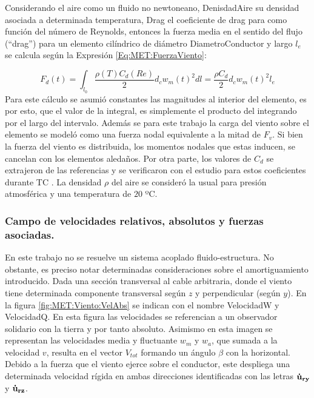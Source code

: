 Considerando el aire como un fluido no newtoneano, \gls{DenisdadAire} su densidad asociada a determinada temperatura, \gls{Drag} el coeficiente de drag para como función del número de Reynolds, entonces la fuerza media en el sentido del flujo (``drag'') para un elemento cilíndrico de diámetro \gls{DiametroConductor} y largo $l_e$ se calcula según la Expresión \eqref{Eq:MET:FuerzaViento}:


\begin{equation}
	\label{Eq:MET:FuerzaViento}
	F_d(t)=\int_{l_0}\frac{\rho (T)C_d(Re)}{2}{d_c w_m(t)^2} dl= \frac{\rho C_d}{2}d_c w_m(t)^2l_{e}
\end{equation}
Para este cálculo se asumió constantes las magnitudes al interior del elemento, es por esto, que el valor de la integral, es simplemente el producto del integrando por el largo del intervalo. Además se para este trabajo la carga del viento sobre el elemento se modeló como una fuerza nodal equivalente a la mitad de $F_v$. Si bien la fuerza del viento es distribuida, los momentos nodales que estas inducen, se cancelan con los elementos aledaños. Por otra parte, los valores de $C_d$ se extrajeron de las referencias \citep{Foti2016} y se verificaron con el estudio para estos coeficientes durante TC \citep{mara2007effects}. La densidad $\rho$ del aire se consideró la usual para presión atmosférica y una temperatura de $20$ ºC.

\subsubsection{Campo de velocidades relativos, absolutos y fuerzas asociadas.}\label{SubSec:MET:CampoVelRealt}
En este trabajo no se resuelve un sistema acoplado fluido-estructura. No obstante, es preciso notar determinadas consideraciones sobre el amortiguamiento introducido. Dada una sección  transversal al cable arbitraria, donde el viento tiene determinada componente transversal según $z$ y perpendicular (según $y$). En la figura \ref{fig:MET:Viento:VelAbs} se indican con el nombre \gls{VelocidadW} y \gls{VelocidadQ}. En esta figura las velocidades se referencian a un observador solidario con la tierra y por tanto  absoluto. Asimismo en esta imagen se representan las velocidades media y fluctuante $w_m$ y $w_a$, que sumada a la velocidad $v$, resulta en el vector $V_{tot}$ formando un ángulo $\beta$ con la horizontal. Debido a la fuerza que el viento ejerce sobre el conductor, este despliega una determinada velocidad rígida en ambas direcciones identificadas con las letras $\bf{\dot{u}}_{ry}$ y $\bf{\dot{u}}_{rz}$. 
% 

